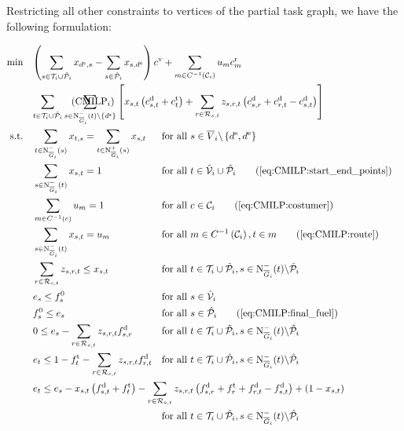 Restricting all other constraints to vertices of the partial task graph, we have the following formulation:

\begin{align}
	\min \quad & \omit\rlap{$\displaystyle{\left(\sum_{s\in\Ti\cup\Phat_i} x_{\ds,s} - \sum_{s\in\Phat_i} x_{s,\de}\right)\cv + \sum_{m\in C^{-1}\left(\mathcal{C}_i\right)} u_m \croute_m}$} \nonumber \\
	& \omit\rlap{$\displaystyle{\sum_{t\in\Ti\cup\Phat_i}\sum_{s\in\Ninoi(t)\backslash\left\{\ds\right\}}\left[x_{s,t}\left(\cd_{s,t}+\ct_t\right)+\sum_{r\in\Rst}z_{s,r,t}\left(\cd_{s,r}+\cd_{r,t}-\cd_{s,t}\right)\right]}$} \tag{$\operatorname{CMILP}_i$} \label{eq:CMILPi} \\
	\text{s.t.} \quad & \sum_{t\in\Ninoi(s)} x_{t,s} = \sum_{t\in\Noutoi(s)} x_{s,t} & & \text{for all } s\in \overline{V}_i\backslash\left\{\ds,\de\right\} \label{eq:CMILP:flow} \\
	& \sum_{s\in\Ninoi(t)} x_{s,t} = 1 && \text{for all } t\in\Vhat_i\cup\Phat_i \tag{\ref{eq:CMILP:start_end_points}} \\
	& \sum_{m\in C^{-1}(c)} u_m = 1 && \text{for all } c\in\mathcal{C}_i \tag{\ref{eq:CMILP:costumer}} \\
	& \sum_{s\in\Ninoi(t)} x_{s,t} = u_m && \text{for all } m\in C^{-1}\left(\mathcal{C}_i\right), t\in m \tag{\ref{eq:CMILP:route}} \\
	& \sum_{r\in\Rst} z_{s,r,t} \leq x_{s,t} && \text{for all } t\in\Ti\cup\Phat_i, s\in\Ninoi(t)\backslash\Phat_i \label{eq:CMILP:refuel} \\
	& e_s \leq f_s^0 & & \text{for all } s\in\Vhat_i \label{eq:CMILP:initial_fuel} \\
	& f^0_s \leq e_s && \text{for all } s\in\Phat_i \tag{\ref{eq:CMILP:final_fuel}} \\
	& 0 \leq e_s - \sum_{r\in\Rst} z_{s,r,t}\fd_{s,r} & & \text{for all } t\in\Ti\cup\Phat_i, s\in\Ninoi(t)\backslash\Phat_i \label{eq:CMILP:min_fuel} \\
	& e_t \leq 1 - \ft_t - \sum_{r\in\Rst} z_{s,r,t}\fd_{r,t} & & \text{for all } t\in\Ti\cup\Phat_i, s\in\Ninoi(t)\backslash\Phat_i \label{eq:CMILP:max_fuel} \\
	& \omit\rlap{$\displaystyle{e_t \leq e_s - x_{s,t}\left(f_{s,t}^{\operatorname{d}}+f_t^{\operatorname{t}}\right) - \sum_{r\in\Rst} z_{s,r,t}\left(\fd_{s,r}+\ft_r+\fd_{r,t}-\fd_{s,t}\right) + \left(1-x_{s,t}\right)}$} \nonumber \\
	& & & \text{for all } t\in\Ti\cup\Phat_i, s\in\Ninoi(t)\backslash\Phat_i \label{eq:CMILP:fuel_consumption} \\

\end{align}
